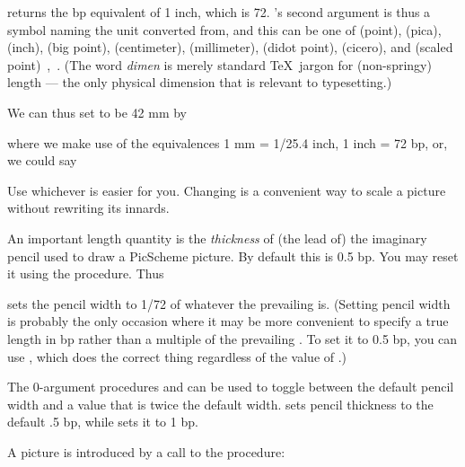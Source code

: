 
\n returns the bp equivalent of 1 inch, which is 72.
's second argument is thus a symbol naming the
unit converted from, and this can be one of 
(point),  (pica),  (inch),  (big
point),  (centimeter),  (millimeter),
 (didot point),  (cicero), and 
(scaled
point)~\cite[ch.~10]{texbook},~\cite[ch.~11]{mfbook}.
(The word {\em dimen} is merely standard \TeX\ jargon for
(non-springy) length --- the only physical dimension
that is relevant to typesetting.)

We can thus
set  to be 42 mm by


\n where we make use of the equivalences 1 mm = 1/25.4 inch,
1 inch = 72 bp, or, we could say


\n Use whichever is easier for you.  Changing
 is a convenient way to scale a
picture without rewriting its innards.


An important length quantity is
the {\em thickness} of (the lead of) the imaginary pencil used to
draw a PicScheme picture.  By default this is 0.5 bp.
You may reset it using the  procedure.
Thus


\n sets the pencil width to 1/72 of whatever the
prevailing  is.  (Setting pencil width is
probably the only occasion where it may be more
convenient to specify a true length in bp rather than a
multiple of the prevailing .  To set
it to 0.5 bp, you can use
,
which does the correct thing regardless of the value of
.)


The 0-argument procedures
 and  can be used to toggle between
the default pencil width and a value that is twice the
default width.
 sets pencil
thickness to the default .5 bp, while
 sets it to 1 bp.


A picture is introduced by a call to the
 procedure:

